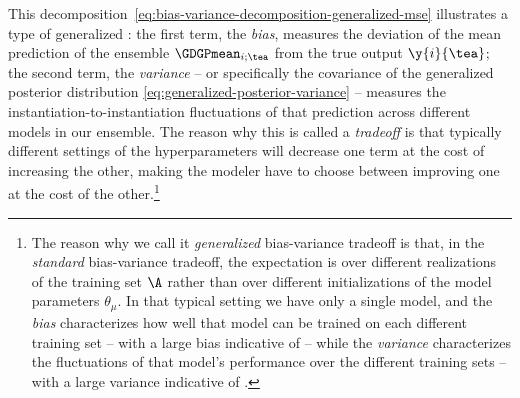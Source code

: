 This decomposition~\eqref{eq:bias-variance-decomposition-generalized-mse} illustrates a type of generalized : 
the first term, the \emph{bias}, measures the deviation of the mean prediction of the ensemble $\GDGPmean_{i;\tea}$ from the true output $\y{i}{\tea}$; the second term, the \emph{variance} -- or specifically the covariance of the generalized posterior distribution \eqref{eq:generalized-posterior-variance} -- measures the instantiation-to-instantiation fluctuations of that prediction across different models in our ensemble. The reason why this is called a \emph{tradeoff} is that typically different settings of the hyperparameters
will decrease one term at the cost of increasing the other, making the modeler have to choose between improving one at the cost of the other.\footnote{The reason why we call it \emph{generalized} bias-variance tradeoff is that, in the \emph{standard} bias-variance tradeoff, the expectation is over different realizations of the training set $\A$ rather than over different initializations of the model parameters $\theta_\mu$. In that typical setting we have only a single model, and the \emph{bias} characterizes how well that model can be trained on each different training set -- with a large bias indicative of  -- while the \emph{variance} characterizes the fluctuations of that model's performance over the different training sets -- with a large variance indicative of . %
}





